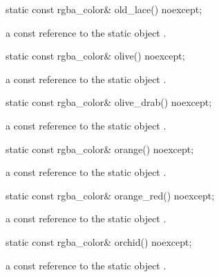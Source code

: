 \begin{itemdecl}
static const rgba_color& old_lace() noexcept;
\end{itemdecl}
\begin{itemdescr}
\pnum
\returns
a const reference to the static  object .
\end{itemdescr}

\begin{itemdecl}
static const rgba_color& olive() noexcept;
\end{itemdecl}
\begin{itemdescr}
\pnum
\returns
a const reference to the static  object .
\end{itemdescr}

\begin{itemdecl}
static const rgba_color& olive_drab() noexcept;
\end{itemdecl}
\begin{itemdescr}
\pnum
\returns
a const reference to the static  object .
\end{itemdescr}

\begin{itemdecl}
static const rgba_color& orange() noexcept;
\end{itemdecl}
\begin{itemdescr}
\pnum
\returns
a const reference to the static  object .
\end{itemdescr}

\begin{itemdecl}
static const rgba_color& orange_red() noexcept;
\end{itemdecl}
\begin{itemdescr}
\pnum
\returns
a const reference to the static  object .
\end{itemdescr}

\begin{itemdecl}
static const rgba_color& orchid() noexcept;
\end{itemdecl}
\begin{itemdescr}
\pnum
\returns
a const reference to the static  object .
\end{itemdescr}

